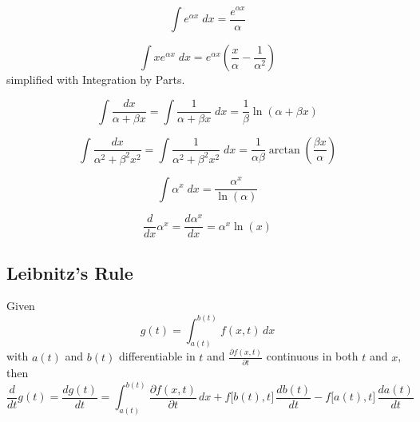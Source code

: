 \begin{equation}\label{eq:Exponential_Indefinite_Integral}
  \int e^{\alpha x} \; dx = \frac{e^{\alpha x}}{\alpha}
\end{equation}

\begin{equation}\label{eq:x_Exponential_Indefinite_Integral}
  \int x e^{\alpha x} \; dx = e^{\alpha x} \left( \frac{x}{\alpha} - \frac{1}{\alpha^{2}} \right)
\end{equation}
 simplified with Integration by Parts.

\begin{equation}\label{eq:Inverse_x_Indefinite_Integral}
  \int \frac{dx}{\alpha + \beta x} = \int \frac{1}{\alpha + \beta x} \; dx = \frac{1}{\beta} \ln (\alpha + \beta x)
\end{equation}

\begin{equation}\label{eq:Inverse_x_Squared_Indefinite_Integral}
  \int \frac{dx}{\alpha^{2} + \beta^{2} x^{2}} = \int \frac{1}{\alpha^{2} + \beta^{2} x^{2}} \; dx = \frac{1}{\alpha \beta} \arctan \left( \frac{\beta x}{\alpha} \right)
\end{equation}

\begin{equation}\label{eq:a_Exponential_Indefinite_Integral}
  \int \alpha^{x} \; dx = \frac{\alpha^{x}}{\ln(\alpha)}
\end{equation}

\begin{equation}\label{eq:a_Exponential_Derivative}
  \frac{d}{dx} \alpha^{x} = \frac{d\alpha^{x}}{dx} = \alpha^{x} \ln(x)
\end{equation}

\subsection{Leibnitz's Rule}\label{subsec:Leibnitzs_Rule}
\begin{lemma}\label{lemma:Leibnitzs_Rule}
  Given
  \begin{equation*}
    g(t) = \int_{a(t)}^{b(t)} f(x, t) \, dx
  \end{equation*}
  with $a(t)$ and $b(t)$ differentiable in $t$ and $\frac{\partial f(x, t)}{\partial t}$ continuous in both $t$ and $x$, then
  \begin{equation}\label{eq:Leibnitzs_Rule}
    \frac{d}{dt} g(t) = \frac{d g(t)}{dt} = \int_{a(t)}^{b(t)} \frac{\partial f(x, t)}{\partial t} \, dx + f \bigl[ b(t), t \bigr] \, \frac{d b(t)}{dt} - f \bigl[ a(t), t \bigr] \, \frac{d a(t)}{dt}
  \end{equation}
\end{lemma}

